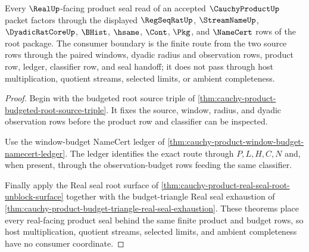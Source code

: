 \begin{theorem}
\label{thm:cauchy-product-real-seal-root-consumer-boundary}
Every $\RealUp$-facing product seal read of an accepted $\CauchyProductUp$ packet factors through the displayed $\RegSeqRatUp$, $\StreamNameUp$, $\DyadicRatCoreUp$, $\BHist$, $\hsame$, $\Cont$, $\Pkg$, and $\NameCert$ rows of the root package. The consumer boundary is the finite route from the two source rows through the paired windows, dyadic radius and observation rows, product row, ledger, classifier row, and seal handoff; it does not pass through host multiplication, quotient streams, selected limits, or ambient completeness.
\end{theorem}
\begin{proof}
Begin with the budgeted root source triple of \autoref{thm:cauchy-product-budgeted-root-source-triple}. It fixes the source, window, radius, and dyadic observation rows before the product row and classifier can be inspected.

Use the window-budget NameCert ledger of \autoref{thm:cauchy-product-window-budget-namecert-ledger}. The ledger identifies the exact route through $P,L,H,C,N$ and, when present, through the observation-budget rows feeding the same classifier.

Finally apply the Real seal root surface of \autoref{thm:cauchy-product-real-seal-root-unblock-surface} together with the budget-triangle Real seal exhaustion of \autoref{thm:cauchy-product-budget-triangle-real-seal-exhaustion}. These theorems place every real-facing product seal behind the same finite product and budget rows, so host multiplication, quotient streams, selected limits, and ambient completeness have no consumer coordinate.
\end{proof}


